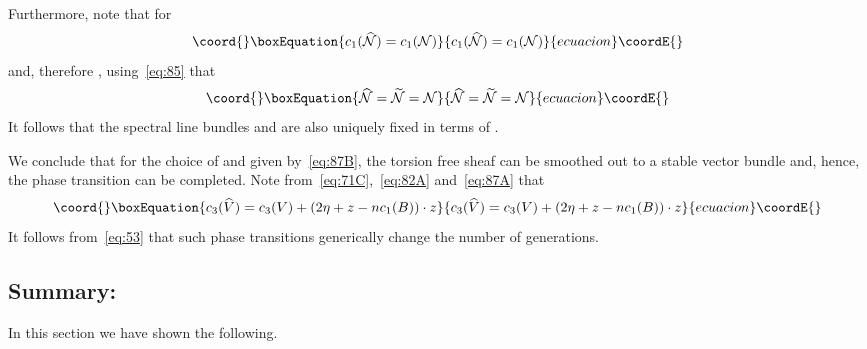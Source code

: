 \documentclass[a4paper,12pt]{article}
\numberwithin{equation}{section}
\def\cN{{\mathcal N}}
\theoremstyle{plain}
\begin{document}
Furthermore, note that for \coordHE{}
\begin{equation}\coord{}\boxEquation{
c_{1}(\widehat{\cN})=c_{1}(\cN)
\label{eq:88}
}{
c_{1}(\widehat{\cN})=c_{1}(\cN)
}{ecuacion}\coordE{}\end{equation}
and, therefore   , using~\eqref{eq:85} that
\begin{equation}\coord{}\boxEquation{
\widehat{\cN}=\widetilde{\cN}=\cN
\label{eq:89}
}{
\widehat{\cN}=\widetilde{\cN}=\cN
}{ecuacion}\coordE{}\end{equation}
It follows that the spectral line bundles \myHighlight{$\widehat{\cN}$}\coordHE{} and
\myHighlight{$\widetilde{\cN}$}\coordHE{}  are
also uniquely fixed in terms of \myHighlight{$\cN$}\coordHE{}. 

We conclude that for the choice of \coordHE{} and \coordHE{} given
by~\eqref{eq:87B}, the torsion free sheaf \coordHE{} can be smoothed out to
a stable \coordHE{} vector bundle \coordHE{} and, hence, the phase
transition can be completed. Note from~\eqref{eq:71C},~\eqref{eq:82A}
and~\eqref{eq:87A} that
\begin{equation}\coord{}\boxEquation{
c_{3}(\widehat{V})=c_{3}(V)+ (2\eta+z-nc_{1}(B))\cdot z
\label{eq:90}
}{
c_{3}(\widehat{V})=c_{3}(V)+ (2\eta+z-nc_{1}(B))\cdot z
}{ecuacion}\coordE{}\end{equation}
It follows from~\eqref{eq:53} that such phase transitions generically change
the number of generations.

\subsection*{Summary:}

In this section we have shown the following.
\end{document}
